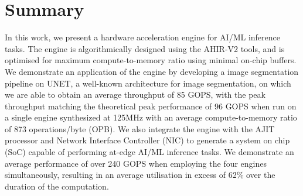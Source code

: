 \documentclass[a4paper,12pt, final]{report}
\begin{document}

\chapter{Summary}

In this work, we present a hardware acceleration engine for AI/ML inference tasks. The engine is algorithmically designed using the AHIR-V2 tools, and is optimised for maximum compute-to-memory ratio using minimal on-chip buffers. We demonstrate an application of the engine by developing a image segmentation pipeline on UNET, a well-known architecture for image segmentation, on which we are able to obtain an average throughput of 85 GOPS, with the peak throughput matching the theoretical peak performance of 96 GOPS when run on a single engine synthesized at 125MHz with an average compute-to-memory ratio of 873 operations/byte (OPB). We also integrate the engine with the AJIT processor and Network Interface Controller (NIC) to generate a system on chip (SoC) capable of performing at-edge AI/ML inference tasks. We demonstrate an average performance of over 240 GOPS when employing the four engines simultaneously, resulting in an average utilisation in excess of 62\% over the duration of the computation.
\\
\end{document}
